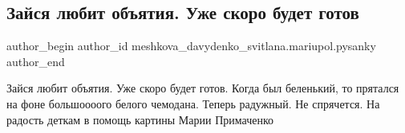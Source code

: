  
 
 
 
 

\subsection{Зайся любит объятия. Уже скоро будет готов}
\label{sec:29_03_2018.fb.meshkova_davydenko_svitlana.mariupol.pysanky.1.zajsja_lybit_objatija}

\ifcmt
 author_begin
   author_id meshkova_davydenko_svitlana.mariupol.pysanky
 author_end
\fi

Зайся любит объятия. Уже скоро будет готов. Когда был беленький, то прятался на
фоне большоооого белого чемодана. Теперь радужный. Не спрячется. На радость
деткам в помощь картины Марии Примаченко
